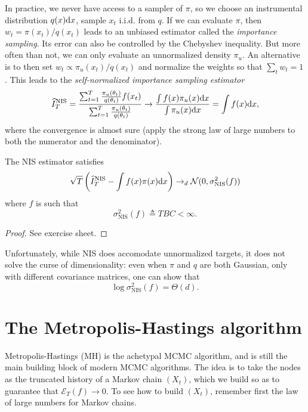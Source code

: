 In practice, we never have access to a sampler of $\pi$, so we choose an instrumental distribution $q(x)\mathrm{d} x$, sample $x_t$ i.i.d. from $q$.
If we can evaluate $\pi$, then $w_t=\pi(x_t)/q(x_t)$ leads to an unbiased estimator called the \emph{importance sampling}. 
Its error can also be controlled by the Chebyshev inequality. 
But more often than not, we can only evaluate an unnormalized density $\pi_u$. 
An alternative is to then set $w_t\propto \pi_u(x_t)/q(x_t)$ and normalize the weights so that $\sum_t w_t=1$. 
This leads to the \emph{self-normalized importance sampling estimator}
$$
\widehat I_T^\text{NIS} = \frac{\sum_{t=1}^T \frac{\pi_u(\theta_t)}{q(\theta_t)} f(x_t)}{\sum_{t=1}^T \frac{\pi_u(\theta_t)}{q(\theta_t)}} \rightarrow \frac{\int f(x)\pi_u(x)\mathrm{d} x}{\int \pi_u(x)\mathrm{d} x} = \int f(x)\mathrm{d} x,
$$
where the convergence is almost sure (apply the strong law of large numbers to both the numerator and the denominator).
\begin{proposition} The NIS estimator satisfies
   $$
   \sqrt{T} \left (\widehat I_T^\text{NIS} - \int f(x)\pi(x)\mathrm{d} x\right ) \rightarrow_d \mathcal{N}(0,\sigma_{\text{NIS}}^2(f))
   $$
   where $f$ is such that
   $$
   \sigma_{\text{NIS}}^2(f) \triangleq TBC <\infty.
   $$
\end{proposition}
\begin{proof}
    See exercise sheet.
\end{proof}
Unfortunately, while NIS does accomodate unnormalized targets, it does not solve the curse of dimensionality: even when $\pi$ and $q$ are both Gaussian, only with different covariance matrices, one can show that 
$$
\log \sigma_{\text{NIS}}^2(f) = \Theta(d).
$$

\section{The Metropolis-Hastings algorithm}
Metropolis-Hastings (MH) is the achetypal MCMC algorithm, and is still the main building block of modern MCMC algorithms. 
The idea is to take the nodes as the truncated history of a Markov chain $(X_t)$, which we build so as to guarantee that $\mathcal{E}_T(f)\rightarrow 0$.
To see how to build $(X_t)$, remember first the law of large numbers for Markov chains. 

